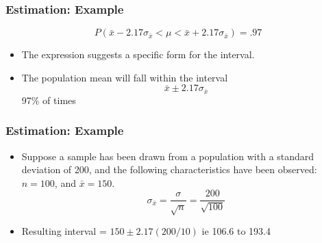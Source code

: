\begin{frame}[fragile]\frametitle{Estimation: Example}
$$P(\bar{x} -2.17 \sigma_{\bar{x}} <  \mu <\bar{x} + 2.17 \sigma_{\bar{x}}) = .97 $$
\begin{itemize}
\item The expression suggests a specific form for the interval. 

\item The population mean will fall within the interval
$$ \bar{x} \pm 2.17 \sigma_{\bar{x}}$$ 97\% of times
\end{itemize}

\end{frame}


\begin{frame}[fragile]\frametitle{Estimation: Example}

\begin{itemize}
%

\item 
Suppose a sample has been drawn from a population with a standard deviation of 200, and the following characteristics have been observed:
$n = 100$, and $\bar{x} = 150$.
$$ \sigma_{\bar{x}} = \frac{\sigma}{\sqrt{n}} = \frac{200}{\sqrt{100}}$$
\item Resulting interval = $150 \pm 2.17 (200/10)$ ie 106.6 to 193.4
\end{itemize}

\end{frame}


%
%




